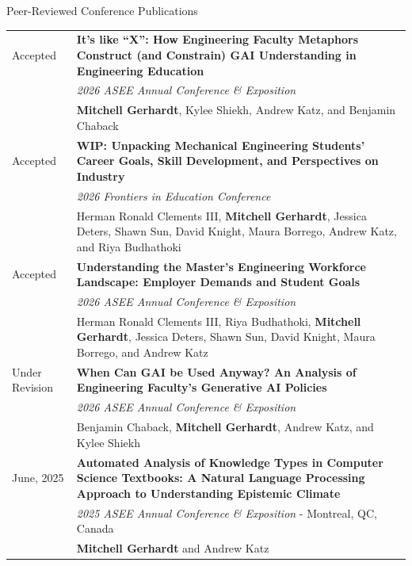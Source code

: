 \documentclass{resume}
\begin{document}


\begin{rSection}{Peer-Reviewed Conference Publications}
\begingroup
\raggedright
\begin{tabularx}{\textwidth}{p{2.5cm}X}

Accepted & \textbf{It's like “X”: How Engineering Faculty Metaphors Construct (and Constrain) GAI Understanding in Engineering Education}\\
& \emph{2026 ASEE Annual Conference \& Exposition}\\
& \textbf{Mitchell Gerhardt}, Kylee Shiekh, Andrew Katz, and Benjamin Chaback \\[1em]

Accepted & \textbf{WIP: Unpacking Mechanical Engineering Students' Career Goals, Skill Development, and Perspectives on Industry}\\
& \emph{2026 Frontiers in Education Conference}\\
& Herman Ronald Clements III, \textbf{Mitchell Gerhardt}, Jessica Deters, Shawn Sun, David Knight, Maura Borrego, Andrew Katz, and Riya Budhathoki \\[2em]


Accepted & \textbf{Understanding the Master’s Engineering Workforce Landscape: Employer Demands and Student Goals}\\
& \emph{2026 ASEE Annual Conference \& Exposition}\\
& Herman Ronald Clements III, Riya Budhathoki, \textbf{Mitchell Gerhardt}, Jessica Deters, Shawn Sun, David Knight, Maura Borrego, and Andrew Katz \\[2em]

Under \newline Revision & \textbf{When Can GAI be Used Anyway? An Analysis of Engineering Faculty’s Generative AI Policies}\\
& \emph{2026 ASEE Annual Conference \& Exposition}\\
& Benjamin Chaback, \textbf{Mitchell Gerhardt}, Andrew Katz, and Kylee Shiekh \\[1em]

June, 2025 & \textbf{Automated Analysis of Knowledge Types in Computer Science Textbooks: A Natural Language Processing Approach to Understanding Epistemic Climate} \hspace{2em [\href{https://peer.asee.org/55491}{Paper}]} \\
& \emph{2025 ASEE Annual Conference \& Exposition} - Montreal, QC, Canada \\
& \textbf{Mitchell Gerhardt} and Andrew Katz \\[1em]


\end{tabularx}
\end{rSection}
\end{document}
